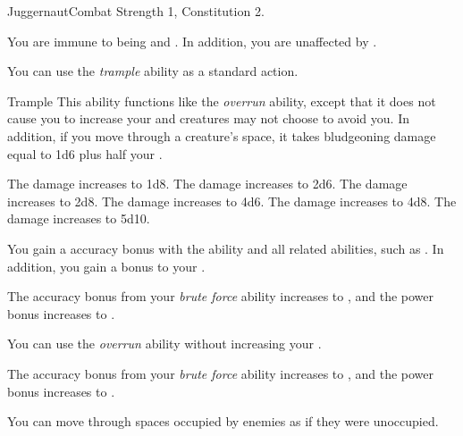     \begin{feat}{Juggernaut}{Combat}
        \featpre Strength 1, Constitution 2.

         You are immune to being \slowed and \immobilized.
        In addition, you are unaffected by .

         You can use the \textit{trample} ability as a standard action.
        \begin{ability}{Trample}
            This ability functions like the \textit{overrun} ability, except that it does not cause you to increase your  and creatures may not choose to avoid you.
            In addition, if you move through a creature's space, it takes bludgeoning damage equal to 1d6 plus half your .

            \rankline
             The damage increases to 1d8.
             The damage increases to 2d6.
             The damage increases to 2d8.
             The damage increases to 4d6.
             The damage increases to 4d8.
             The damage increases to 5d10.
        \end{ability}

         You gain a  accuracy bonus with the  ability and all related abilities, such as .
        In addition, you gain a  bonus to your .

         The accuracy bonus from your \textit{brute force} ability increases to , and the power bonus increases to .

         You can use the \textit{overrun} ability without increasing your .

         The accuracy bonus from your \textit{brute force} ability increases to , and the power bonus increases to .

         You can move through spaces occupied by enemies as if they were unoccupied.
    \end{feat}

